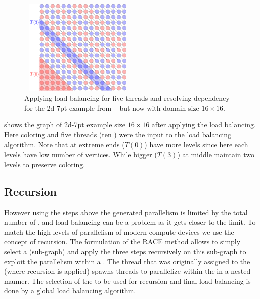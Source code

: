   \setlength{\belowcaptionskip}{-10pt}
  \begin{figure}[t]
  	\begin{minipage}[c]{0.26\textwidth}
  	\includegraphics[height=12.4em,width=15.2em]{pics/race_method/load_balancing}
  	\end{minipage}\hspace{2.2em}
  	 \begin{minipage}[c]{0.16\textwidth}
  	\caption{\label{fig:lb} Applying load balancing for five threads and resolving \DTWO
  		dependency for the 2d-7pt example from ~ but now with domain size $16\times16$.  }
  	\end{minipage}
  \end{figure}
   \setlength{\belowcaptionskip}{0pt}
   
   shows the graph of 2d-7pt example size $16\times16$ after
   applying the load balancing. Here \DTWO coloring and five threads
    (\ie ten \levelGroups) were the input to the load balancing algorithm.
    Note that \levelGroups at extreme ends (\eg $T(0)$) have more levels
    since here each levels have low number of vertices. While bigger \levelGroups
    (\eg $T(3)$) at middle maintain two levels to preserve \DK coloring.
    
\subsection{Recursion}
However using the steps above the generated parallelism is limited by the total number
of \levels, and load balancing can be a problem as it gets closer to the limit.
To match the high levels of parallelism of modern compute devices we use the
concept of recursion. The formulation of the \acrshort{RACE} method allows
 to simply select a \levelGroup (sub-graph) and apply the three
 steps recursively on this sub-graph to exploit the parallelism 
 within a \levelGroup. The thread that was originally assigned to the
 \levelGroup (where recursion is applied) spawns threads to parallelize
 within the \levelGroup in a nested manner. 
 The selection of the \levelGroup to be used for recursion and final load balancing 
 is done by  a global load balancing algorithm.
 
